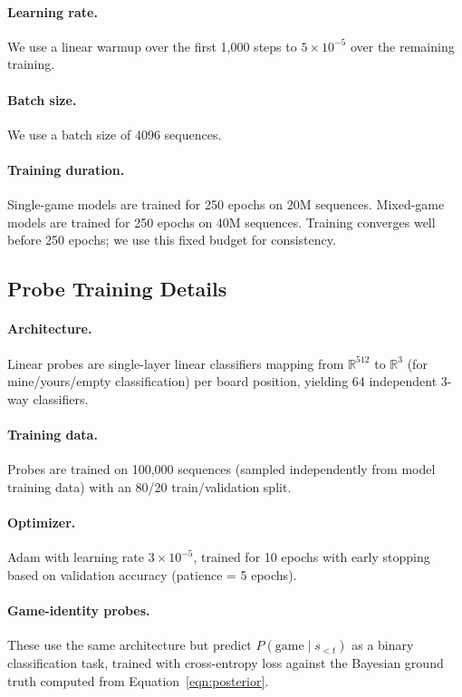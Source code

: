 \documentclass{article}
\theoremstyle{plain}
\theoremstyle{definition}
\theoremstyle{remark}
\begin{document}
\paragraph{Learning rate.} We use a linear warmup over the first 1,000 steps to $5 \times 10^{-5}$ over the remaining training.

\paragraph{Batch size.} We use a batch size of 4096 sequences.

\paragraph{Training duration.} Single-game models are trained for 250 epochs on 20M sequences. Mixed-game models are trained for 250 epochs on 40M sequences. Training converges well before 250 epochs; we use this fixed budget for consistency.

\subsection{Probe Training Details}
\label{app:probes}

\paragraph{Architecture.} Linear probes are single-layer linear classifiers mapping from $\mathbb{R}^{512}$ to $\mathbb{R}^{3}$ (for mine/yours/empty classification) per board position, yielding 64 independent 3-way classifiers.

\paragraph{Training data.} Probes are trained on 100,000 sequences (sampled independently from model training data) with an 80/20 train/validation split.

\paragraph{Optimizer.} Adam with learning rate $3 \times 10^{-5}$, trained for 10 epochs with early stopping based on validation accuracy (patience = 5 epochs).

\paragraph{Game-identity probes.} These use the same architecture but predict $P(\text{game} \mid s_{<t})$ as a binary classification task, trained with cross-entropy loss against the Bayesian ground truth computed from Equation~\ref{eqn:posterior}.
\end{document}
